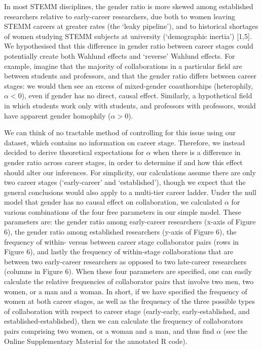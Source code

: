 \documentclass[12pt,]{article}
\begin{document}
In most STEMM disciplines, the gender ratio is more skewed among
established researchers relative to early-career researchers, due both
to women leaving STEMM careers at greater rates (the `leaky pipeline'),
and to historical shortages of women studying STEMM subjects at
university (`demographic inertia') {[}1,5{]}. We hypothesised that this
difference in gender ratio between career stages could potentially
create both Wahlund effects and `reverse' Wahlund effects. For example,
imagine that the majority of collaborations in a particular field are
between students and professors, and that the gender ratio differs
between career stages: we would then see an excess of mixed-gender
coauthorships (heterophily, \(\alpha < 0\)), even if gender has no
direct, causal effect. Similarly, a hypothetical field in which students
work only with students, and professors with professors, would have
apparent gender homophily (\(\alpha > 0\)).

We can think of no tractable method of controlling for this issue using
our dataset, which contains no information on career stage. Therefore,
we instead decided to derive theoretical expectations for \(\alpha\)
when there is a difference in gender ratio across career stages, in
order to determine if and how this effect should alter our inferences.
For simplicity, our calculations assume there are only two career stages
(`early-career' and `established'), though we expect that the general
conclusions would also apply to a multi-tier career ladder. Under the
null model that gender has no causal effect on collaboration, we
calculated \(\alpha\) for various combinations of the four free
parameters in our simple model. These parameters are: the gender ratio
among early-career researchers (x-axis of Figure 6), the gender ratio
among established researchers (y-axis of Figure 6), the frequency of
within- versus between career stage collaborator pairs (rows in Figure
6), and lastly the frequency of within-stage collaborations that are
between two early-career researchers as opposed to two late-career
researchers (columns in Figure 6). When these four parameters are
specified, one can easily calculate the relative frequencies of
collaborator pairs that involve two men, two women, or a man and a
woman. In short, if we have specified the frequency of women at both
career stages, as well as the frequency of the three possible types of
collaboration with respect to career stage (early-early,
early-established, and established-established), then we can calculate
the frequency of collaborators pairs comprising two women, or a woman
and a man, and thus find \(\alpha\) (see the Online Supplementary
Material for the annotated R code).
\end{document}
